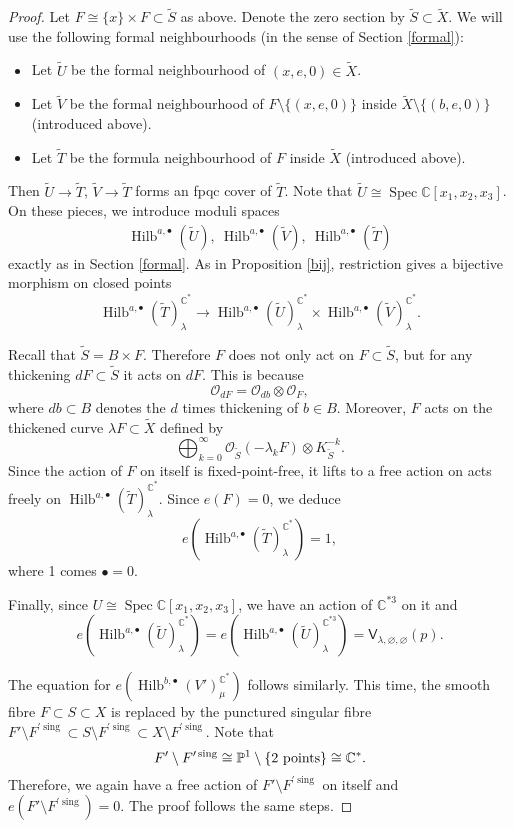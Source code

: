 \documentclass{amsart}
\theoremstyle{definition}
\newcommand{\CC} {\mathbb{C}}          %
\newcommand{\PP} {\mathbb{P}}
\renewcommand{\O}{\mathcal{O}}
\newcommand{\sfV}{\mathsf{V}}
\newcommand{\Hilb}{\operatorname{Hilb}}
\newcommand{\Spec}{\operatorname{Spec}}
\newcommand{\sing}{\operatorname{sing}}
\begin{document}
\begin{proof}
Let $F \cong \{x\} \times F \subset \tilde{S}$ as above. Denote the zero section by $\tilde{S} \subset \tilde{X}$. We will use the following formal neighbourhoods (in the sense of Section \ref{formal}): 
\begin{itemize}
\item Let $\tilde{U}$ be the formal neighbourhood of $(x,e,0) \in \tilde{X}$.
\item Let $\tilde{V}$ be the formal neighbourhood of $F \setminus \{(x,e,0)\}$ inside $\tilde{X} \setminus \{(b,e,0)\}$ (introduced above).
\item Let $\tilde{T}$ be the formula neighbourhood of $F$ inside $\tilde{X}$ (introduced above).
\end{itemize}
Then $\tilde{U} \rightarrow \tilde{T}$, $\tilde{V} \rightarrow \tilde{T}$ forms an fpqc cover of $\tilde{T}$. Note that $\tilde{U} \cong \Spec \CC[x_1,x_2,x_3]$. On these pieces, we introduce moduli spaces 
\begin{align*}
\Hilb^{a,\bullet}(\tilde{U}), \ \Hilb^{a,\bullet}(\tilde{V}), \ \Hilb^{a,\bullet}(\tilde{T})
\end{align*}
exactly as in Section \ref{formal}. As in Proposition \ref{bij}, restriction gives a bijective morphism on closed points
$$
\Hilb^{a,\bullet}(\tilde{T})^{\CC^*}_{\lambda} \rightarrow \Hilb^{a,\bullet}(\tilde{U})^{\CC^*}_{\lambda} \times \Hilb^{a,\bullet}(\tilde{V})^{\CC^*}_{\lambda}.
$$

Recall that $\tilde{S} = B \times F$. Therefore $F$ does not only act on $F \subset \tilde{S}$, but for any thickening $d F \subset \tilde{S}$ it acts on $d F$. This is because
$$
\O_{dF} = \O_{db} \otimes \O_F,
$$
where $db \subset B$ denotes the $d$ times thickening of $b \in B$. Moreover, $F$ acts on the thickened curve $\lambda F \subset \tilde{X}$ defined by
$$
\bigoplus_{k=0}^{\infty} \O_{\tilde{S}}(-\lambda_k F) \otimes K_{\tilde{S}}^{-k}.
$$
Since the action of $F$ on itself is fixed-point-free, it lifts to a free action on acts freely on $\Hilb^{a,\bullet}(\tilde{T})^{\CC^*}_{\lambda}$. Since $e(F)=0$, we deduce
$$
e(\Hilb^{a,\bullet}(\tilde{T})^{\CC^*}_{\lambda}) = 1,
$$ 
where 1 comes $\bullet = 0$.

Finally, since $U \cong \Spec \CC[x_1,x_2,x_3]$, we have an action of $\CC^{*3}$ on it and 
$$
e(\Hilb^{a,\bullet}(\tilde{U})^{\CC^*}_{\lambda}) = e(\Hilb^{a,\bullet}(\tilde{U})^{\CC^{*3}}_{\lambda}) = \sfV_{\lambda,\varnothing,\varnothing}(p).
$$

The equation for $e(\Hilb^{b,\bullet}(V')_{\mu}^{\CC^*})$ follows similarly. This time, the smooth fibre $F \subset S \subset X$ is replaced by the punctured singular fibre $F' \setminus F^{\prime \sing} \subset S \setminus F^{\prime \sing} \subset X \setminus F^{\prime \sing}$. Note that
$$
F' \setminus F^{\prime \sing} \cong \PP^1 \setminus \{2 \ \rm{points}\} \cong \CC^*.
$$
Therefore, we again have a free action of $F' \setminus F^{\prime \sing}$ on itself and $e(F' \setminus F^{\prime \sing}) = 0$. The proof follows the same steps.
\end{proof}   
\end{document}
